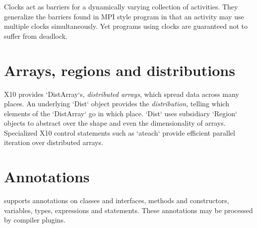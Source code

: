 
Clocks act as {barriers} for a dynamically varying collection of activities.
They generalize the barriers found in MPI style program in that an activity
may use multiple clocks simultaneously. Yet programs using clocks are
guaranteed not to suffer from deadlock.


\section{Arrays, regions and distributions}

X10 provides \xcd`DistArray`s, {\em distributed arrays}, which spread data
across many places. An underlying \xcd`Dist` object provides the {\em
distribution}, telling which elements of the \xcd`DistArray` go in which
place. \xcd`Dist` uses subsidiary \xcd`Region` objects to abstract over the
shape and even the dimensionality of arrays.
Specialized X10 control statements such as \xcd`ateach` provide efficient
parallel iteration over distributed arrays.


\section{Annotations}

\Xten{} supports annotations on classes and interfaces, methods
and constructors,
variables, types, expressions and statements.
These annotations may be processed by compiler plugins.

